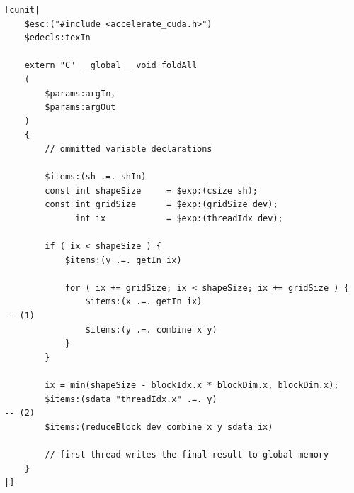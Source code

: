 \begin{lstlisting}[style=haskell_float
    ,label=lst:foldAll_skeleton
    ,caption={Accelerate CUDA skeleton for the \code{foldAll} operation}]
[cunit|
    $esc:("#include <accelerate_cuda.h>")
    $edecls:texIn

    extern "C" __global__ void foldAll
    (
        $params:argIn,
        $params:argOut
    )
    {
        // ommitted variable declarations

        $items:(sh .=. shIn)
        const int shapeSize     = $exp:(csize sh);
        const int gridSize      = $exp:(gridSize dev);
              int ix            = $exp:(threadIdx dev);

        if ( ix < shapeSize ) {
            $items:(y .=. getIn ix)

            for ( ix += gridSize; ix < shapeSize; ix += gridSize ) {
                $items:(x .=. getIn ix)                                                -- (1)
                $items:(y .=. combine x y)
            }
        }

        ix = min(shapeSize - blockIdx.x * blockDim.x, blockDim.x);
        $items:(sdata "threadIdx.x" .=. y)                                             -- (2)
        $items:(reduceBlock dev combine x y sdata ix)

        // first thread writes the final result to global memory
    }
|]
\end{lstlisting}

